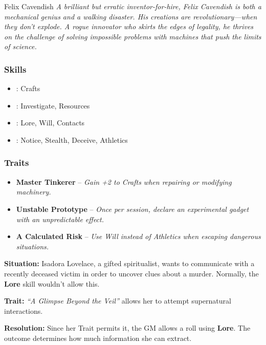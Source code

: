 \begin{WyrdNPC}[float=!t]{Felix Cavendish}
	\emph{A brilliant but erratic inventor-for-hire, Felix Cavendish is both a mechanical genius and a walking disaster. His creations are revolutionary—when they don’t explode. A rogue innovator who skirts the edges of legality, he thrives on the challenge of solving impossible problems with machines that push the limits of science.}

	\subsubsection*{Skills}
	\begin{itemize}
    	\item \Expert: Crafts
	    \item \Skilled: Investigate, Resources
    	\item \Novice: Lore, Will, Contacts
	    \item \Untrained: Notice, Stealth, Deceive, Athletics
	\end{itemize}

	\subsubsection*{Traits}
	\begin{itemize}
    	\item \textbf{Master Tinkerer} – \emph{Gain +2 to Crafts when repairing or modifying machinery.}
	    \item \textbf{Unstable Prototype} – \emph{Once per session, declare an experimental gadget with an unpredictable effect.}
    	\item \textbf{A Calculated Risk} – \emph{Use Will instead of Athletics when escaping dangerous situations.}
	\end{itemize}
\end{WyrdNPC}


\begin{WyrdExample}
	\textbf{Situation:} Isadora Lovelace, a gifted spiritualist, wants to communicate with a recently deceased victim in order to uncover clues about a murder. Normally, the \textbf{Lore} skill wouldn’t allow this.

	\noindent\textbf{Trait:} \emph{“A Glimpse Beyond the Veil”} allows her to attempt supernatural interactions.

	\noindent\textbf{Resolution:} Since her Trait permits it, the GM allows a roll using \textbf{Lore}. The outcome determines how much information she can extract.
\end{WyrdExample}

